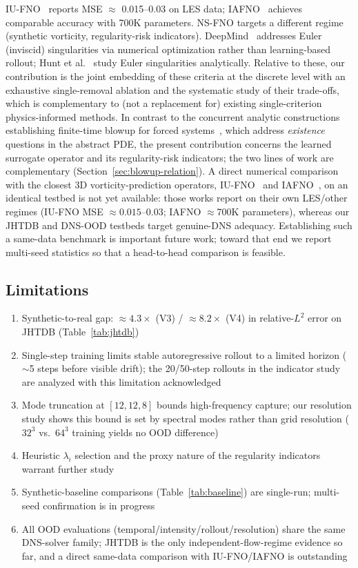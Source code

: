 \documentclass[review]{elsarticle}
\begin{document}
IU-FNO~\cite{li2023iufno} reports MSE $\approx$ 0.015--0.03 on LES data; IAFNO~\cite{jiang2025iafno} achieves comparable accuracy with 700K parameters. NS-FNO targets a different regime (synthetic vorticity, regularity-risk indicators). DeepMind~\cite{wang2025singularity} addresses Euler (inviscid) singularities via numerical optimization rather than learning-based rollout; Hunt et al.~\cite{hunt2023euler} study Euler singularities analytically. Relative to these, our contribution is the joint embedding of these criteria at the discrete level with an exhaustive single-removal ablation and the systematic study of their trade-offs, which is complementary to (not a replacement for) existing single-criterion physics-informed methods. In contrast to the concurrent analytic constructions establishing finite-time blowup for forced systems~\cite{openai2026ns,buckmaster2023ns,cordoba2023eulerforce}, which address \emph{existence} questions in the abstract PDE, the present contribution concerns the learned surrogate operator and its regularity-risk indicators; the two lines of work are complementary (Section~\ref{sec:blowup-relation}). A direct numerical comparison with the closest 3D vorticity-prediction operators, IU-FNO~\cite{li2023iufno} and IAFNO~\cite{jiang2025iafno}, on an identical testbed is not yet available: those works report on their own LES/other regimes (IU-FNO MSE $\approx 0.015$--$0.03$; IAFNO $\approx$700K parameters), whereas our JHTDB and DNS-OOD testbeds target genuine-DNS adequacy. Establishing such a same-data benchmark is important future work; toward that end we report multi-seed statistics so that a head-to-head comparison is feasible.

\subsection{Limitations}
\label{sec:limitations}
\begin{enumerate}
    \item Synthetic-to-real gap: $\approx 4.3\times$ (V3) / $\approx 8.2\times$ (V4) in relative-$L^2$ error on JHTDB (Table~\ref{tab:jhtdb})
    \item Single-step training limits stable autoregressive rollout to a limited horizon ($\sim$5 steps before visible drift); the 20/50-step rollouts in the indicator study are analyzed with this limitation acknowledged
    \item Mode truncation at $[12,12,8]$ bounds high-frequency capture; our resolution study shows this bound is set by spectral modes rather than grid resolution ($32^3$ vs.\ $64^3$ training yields no OOD difference)
    \item Heuristic $\lambda_i$ selection and the proxy nature of the regularity indicators warrant further study
    \item Synthetic-baseline comparisons (Table~\ref{tab:baseline}) are single-run; multi-seed confirmation is in progress
    \item All OOD evaluations (temporal/intensity/rollout/resolution) share the same DNS-solver family; JHTDB is the only independent-flow-regime evidence so far, and a direct same-data comparison with IU-FNO/IAFNO is outstanding
\end{enumerate}
\end{document}
